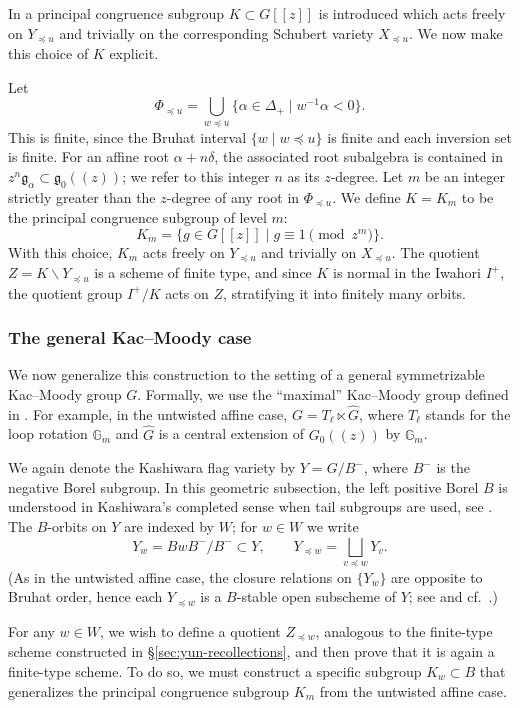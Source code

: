 \documentclass{amsart}
\theoremstyle{definition}
\numberwithin{equation}{section}
\begin{document}
In \cite[\S 5.2]{Yun} a principal congruence subgroup $K \subset G[[z]]$ is introduced which acts freely on $Y_{\preceq u}$ and trivially on the corresponding Schubert variety $X_{\preceq u}$. We now make this choice of $K$ explicit.

Let
\[
\Phi_{\preceq u}=\bigcup_{w\preceq u}\{\alpha\in\Delta_+\mid w^{-1}\alpha<0\}.
\]
This is finite, since the Bruhat interval $\{w\mid w\preceq u\}$ is finite and each
inversion set is finite. For an affine root $\alpha+n\delta$, the associated root
{ subalgebra} is contained in $z^n\mathfrak g_\alpha\subset \mathfrak g_0(\!(z)\!)$; we
refer to this integer $n$ as its $z$-degree. Let $m$ be an integer strictly greater
than the $z$-degree of any root in $\Phi_{\preceq u}$. We define $K = K_m$ to be the principal
congruence subgroup of level $m$:
\[
K_m = \{ g \in G[[z]] \mid g \equiv 1 \pmod{z^m} \}.
\]
With this choice, $K_m$ acts freely on $Y_{\preceq u}$ and trivially on $X_{\preceq u}$. The quotient $Z = K \backslash Y_{\preceq u}$ is a scheme of finite type, and since $K$ is normal in the Iwahori $I^+$, the quotient group $I^+/K$ acts on $Z$, stratifying it into finitely many orbits.



\subsubsection{The general Kac--Moody case}

We now generalize this construction to the setting of a general symmetrizable Kac--Moody
group $G$. Formally, we use the ``maximal'' Kac--Moody group defined in \cite[\S 6.1.16]{Kumar}.
For example, in the untwisted affine case, $G=T_\ell\ltimes \hat{G}$, where $T_\ell$ stands for the loop rotation $\mathbb{G}_m$ and $\hat{G}$ is a central extension of $G_0(\!(z)\!)$ by $\mathbb{G}_m$.

We again denote the Kashiwara flag variety by $Y = G/B^-$, where $B^-$ is the
negative Borel subgroup. In this geometric subsection, the left positive Borel $B$ is understood in
Kashiwara's completed sense when tail subgroups are used, see \cite[\S5]{K}. The $B$-orbits on $Y$
are indexed by $W$; for $w\in W$ we write
\[
Y_w = BwB^-/B^- \subset Y,
\qquad
Y_{\preceq w} = \bigsqcup_{v\preceq w} Y_v.
\]
(As in the untwisted affine case, the closure relations on $\{Y_w\}$ are opposite to
Bruhat order, hence each $Y_{\preceq w}$ is a $B$-stable open subscheme of $Y$; see
\cite[\S 5]{K} and cf.\ \cite[\S 5.2]{Yun}.)

For any $w \in W$, we wish to define a quotient $Z_{\preceq w}$, analogous to the
finite-type scheme constructed in \S\ref{sec:yun-recollections}, and then prove
that it is again a finite-type scheme. To do so, we must construct a specific
subgroup $K_w \subset B$ that generalizes the principal congruence subgroup $K_m$
from the untwisted affine case.
\end{document}
